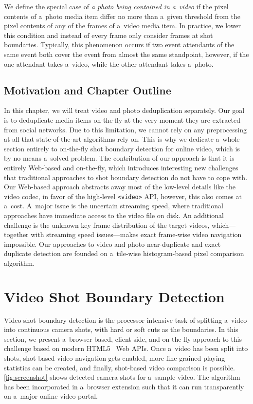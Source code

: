 We define the special case of
\emph{a photo being contained in a~video} if the pixel contents
of a~photo media item differ no more than a~given threshold from
the pixel contents of any of the frames of a~video media item.
In practice, we lower this condition and instead of every frame
only consider frames at shot boundaries.
Typically, this phenomenon occurs if two event attendants
of the same event both cover the event from almost the same
standpoint, however, if the one attendant takes a~video,
while the other attendant takes a~photo.

\subsection{Motivation and Chapter Outline}

In this chapter, we will treat video
and photo deduplication separately. 
Our goal is to deduplicate media items on-the-fly
at the very moment they are extracted from social networks.
Due to this limitation, we cannot rely on any preprocessing
at all that state-of-the-art algorithms rely on.
This is why we dedicate a~whole section entirely to on-the-fly
shot boundary detection for online video,
which is by no means a~solved problem.
The contribution of our approach is that it is entirely Web-based
and on-the-fly, which introduces interesting new challenges
that traditional approaches to shot boundary detection
do not have to cope with.
Our Web-based approach abstracts away most of the low-level details
like the video codec, in favor of the high-level \texttt{<video>}
API, however, this also comes at a~cost.
A~major issue is the uncertain streaming speed,
where traditional approaches have immediate access
to the video file on disk.
An additional challenge is the unknown key frame distribution
of the target videos, which---together with streaming speed
issues---makes exact frame-wise video navigation impossible.
Our approaches to video and photo near-duplicate
and exact duplicate detection are founded
on a~tile-wise histogram-based pixel comparison algorithm.

\section{Video Shot Boundary Detection}
Video shot boundary detection is the processor-intensive task
of splitting a~video into continuous camera shots,
with hard or soft cuts as the boundaries.
In this section, we present a~browser-based, client-side, and
on-the-fly approach to this challenge
based on modern HTML5~\cite{berjon2012html5} Web APIs.
Once a~video has been split into shots,
shot-based video navigation gets enabled,
more fine-grained playing statistics can be created,
and finally, shot-based video comparison is possible.
\autoref{fig:screenshot} shows detected camera
shots for a~sample video.
The algorithm has been incorporated in a~browser extension
such that it can run transparently on a~major online video portal.

